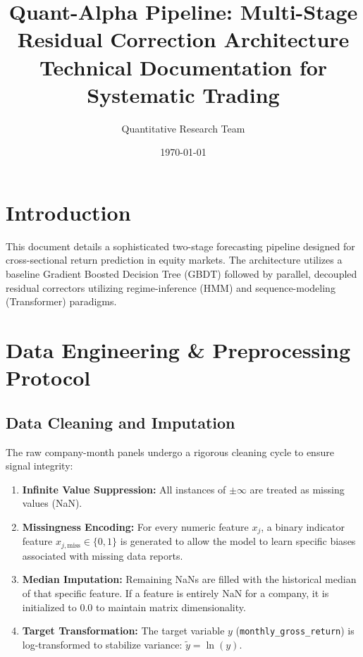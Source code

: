 \documentclass[11pt]{article}
\title{Quant-Alpha Pipeline: Multi-Stage Residual Correction Architecture \\ \large Technical Documentation for Systematic Trading}
\author{Quantitative Research Team}
\date{\today}
\begin{document}
\maketitle
\tableofcontents
\newpage

\section{Introduction}
This document details a sophisticated two-stage forecasting pipeline designed for cross-sectional return prediction in equity markets. The architecture utilizes a baseline Gradient Boosted Decision Tree (GBDT) followed by parallel, decoupled residual correctors utilizing regime-inference (HMM) and sequence-modeling (Transformer) paradigms.

\section{Data Engineering \& Preprocessing Protocol}

\subsection{Data Cleaning and Imputation}
The raw company-month panels undergo a rigorous cleaning cycle to ensure signal integrity:
\begin{enumerate}
    \item \textbf{Infinite Value Suppression:} All instances of $\pm \infty$ are treated as missing values (NaN).
    \item \textbf{Missingness Encoding:} For every numeric feature $x_j$, a binary indicator feature $x_{j, \text{miss}} \in \{0, 1\}$ is generated to allow the model to learn specific biases associated with missing data reports.
    \item \textbf{Median Imputation:} Remaining NaNs are filled with the historical median of that specific feature. If a feature is entirely NaN for a company, it is initialized to 0.0 to maintain matrix dimensionality.
    \item \textbf{Target Transformation:} The target variable $y$ (\texttt{monthly\_gross\_return}) is log-transformed to stabilize variance: $\tilde{y} = \ln(y)$.
\end{enumerate}
\end{document}
